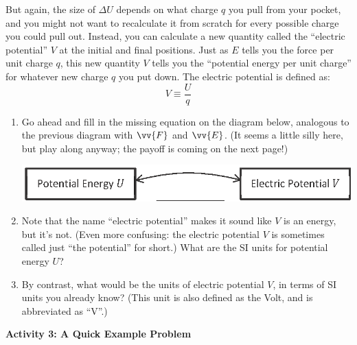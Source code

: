 But again, the size of $\Delta U$ depends on what charge $q$ you pull from your pocket, and you might not want to recalculate it from scratch for every possible charge you could pull out.  Instead, you can calculate a new quantity called the ``electric potential'' $V$ at the initial and final positions.  Just as $E$ tells you the force per unit charge $q$, this new quantity $V$ tells you the ``potential energy per unit charge'' for whatever new charge $q$ you put down.  The electric potential is defined as:
$$V \equiv \frac{U}{q}$$
\vspace{-0.3 in}
\begin{enumerate}[labparts]

\item Go ahead and fill in the missing equation on the diagram below, analogous to the previous diagram with $\vv{F}$ and $\vv{E}$.  (It seems a little silly here, but play along anyway; the payoff is coming on the next page!)
\begin{center}
\includegraphics{potential_intro/concept_map_figs/concept_map_U_and_V_blank.eps}
\end{center}

\item Note that the name ``electric potential'' makes it sound like $V$ is an energy, but it's not.  (Even more confusing: the electric potential $V$ is sometimes called just ``the potential'' for short.)  What are the SI units for potential energy $U$?  
\answerspace{0.3in}

\item By contrast, what would be the units of electric potential $V$, in terms of SI units you already know?  (This unit is also defined as the Volt, and is abbreviated as ``V''.)
\answerspace{0.3in}

\end{enumerate}

\pagebreak[2]
\textbf{Activity 3: A Quick Example Problem}


